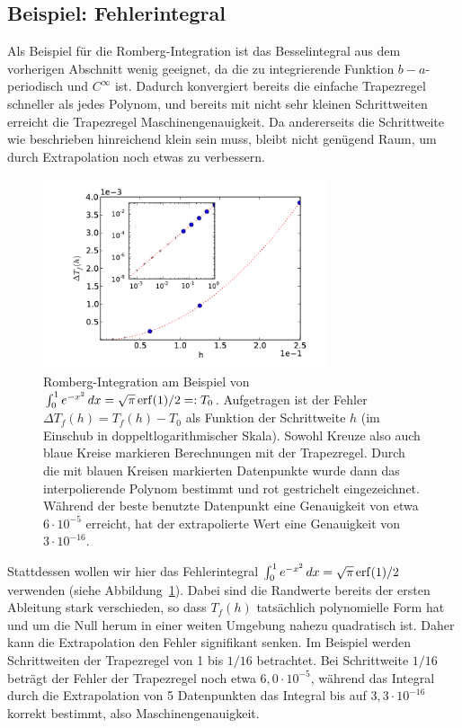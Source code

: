 
\afterpage{\clearpage}
  
\subsection{Beispiel: Fehlerintegral}

Als Beispiel für die Romberg-Integration ist das Besselintegral aus
dem vorherigen Abschnitt wenig geeignet, da die zu integrierende
Funktion $b-a$-periodisch und $C^\infty$ ist. Dadurch konvergiert
bereits die einfache Trapezregel schneller als jedes Polynom, und
bereits mit nicht sehr kleinen Schrittweiten erreicht die Trapezregel
Maschinengenauigkeit. Da andererseits die Schrittweite wie beschrieben
hinreichend klein sein muss, bleibt nicht genügend Raum, um durch
Extrapolation noch etwas zu verbessern. 

\begin{figure}
  \centering
  \includegraphics[width=0.75\textwidth]{plots/romberg}
  \caption{Romberg-Integration am Beispiel von $\int_0^1 e^{-x^2}\,dx
    = \sqrt{\pi}\operatorname{erf}(1)/2 =: T_0$. Aufgetragen ist der Fehler $\Delta
    T_f(h) = T_f(h) - T_0$ als Funktion der Schrittweite $h$ (im Einschub
    in doppeltlogarithmischer Skala). Sowohl Kreuze also auch blaue
    Kreise markieren Berechnungen mit der Trapezregel. Durch die mit
    blauen Kreisen markierten Datenpunkte wurde dann das
    interpolierende Polynom bestimmt und rot gestrichelt
    eingezeichnet. Während der beste benutzte Datenpunkt eine
    Genauigkeit von etwa $6\cdot10^{-5}$ erreicht, hat der
    extrapolierte Wert eine Genauigkeit von $3\cdot 10^{-16}$.  }
  \label{fig:romberg}
\end{figure}

Stattdessen wollen wir hier das Fehlerintegral $\int_0^1 e^{-x^2}\,dx
= \sqrt{\pi}\operatorname{erf}(1)/2$ verwenden (siehe Abbildung~\ref{fig:romberg}).
Dabei sind die Randwerte bereits der ersten Ableitung stark
verschieden, so dass $T_f(h)$ tatsächlich polynomielle Form hat und um
die Null herum in einer weiten Umgebung nahezu quadratisch ist. Daher
kann die Extrapolation den Fehler signifikant senken.  Im Beispiel
werden Schrittweiten der Trapezregel von 1 bis $1/16$ betrachtet. Bei
Schrittweite $1/16$ beträgt der Fehler der Trapezregel noch etwa
$6,0\cdot 10^{-5}$, während das Integral durch die Extrapolation von 5
Datenpunkten das Integral bis auf $3,3\cdot 10^{-16}$ korrekt
bestimmt, also Maschinengenauigkeit.

